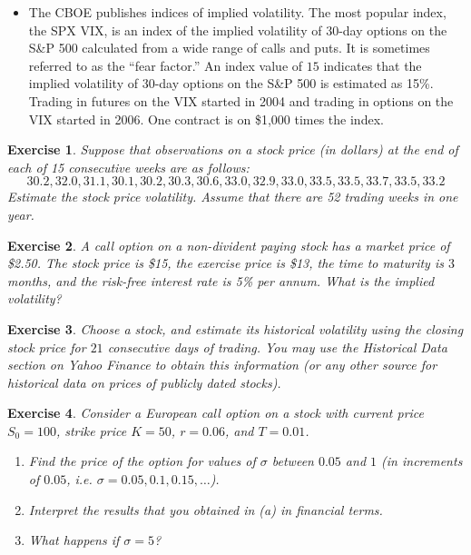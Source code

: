 \documentclass[letterpaper,10pt]{article}
\newtheorem{ex}{Exercise}
\begin{document}
\begin{itemize}
\item The CBOE publishes indices of implied volatility. The most popular index, the SPX VIX, is an index of the implied volatility of 30-day options on the S\&P 500 calculated from a wide range of calls and puts. It is sometimes referred to as the ``fear factor.” An index value of $15$ indicates that the implied volatility of 30-day options on the S\&P 500 is estimated as 15\%. Trading in futures on the VIX started in 2004 and trading in options on the VIX started in 2006. One contract is on \$1,000 times the index.

\end{itemize}




\begin{ex}  Suppose that observations on a stock price (in dollars) at the end of each of 15 consecutive weeks are as follows:
$$30.2, 32.0, 31.1, 30.1, 30.2, 30.3, 30.6, 33.0, 32.9, 33.0, 33.5, 33.5, 33.7, 33.5, 33.2$$
Estimate the stock price volatility. Assume that there are 52 trading weeks in one year.
\end{ex}

\begin{ex} A call option on a non-divident paying stock has a market price of \$2.50.  The stock price is \$15, the exercise price is \$13, the time to maturity is $3$ months, and the risk-free interest rate is 5\% per annum. What is the implied volatility?
\end{ex}
\begin{ex}  Choose a stock, and estimate its historical volatility using the closing stock price for $21$ consecutive days of trading.  You may use the Historical Data section on Yahoo Finance to obtain this information (or any other source for historical data on prices of publicly dated stocks).  
\end{ex}

\begin{ex} Consider a European call option on a stock with current price $S_0=100$, strike price $K=50$, $r=0.06$, and $T=0.01$.  
\begin{enumerate}


\item Find the price of the option for values of $\sigma$ between $0.05$ and $1$ (in increments of $0.05$, i.e. $\sigma=0.05, 0.1, 0.15,\ldots$).  

\item Interpret the results that you obtained in (a) in financial terms.

\item What happens if $\sigma=5$?

\end{enumerate}

\end{ex}
\end{document}
